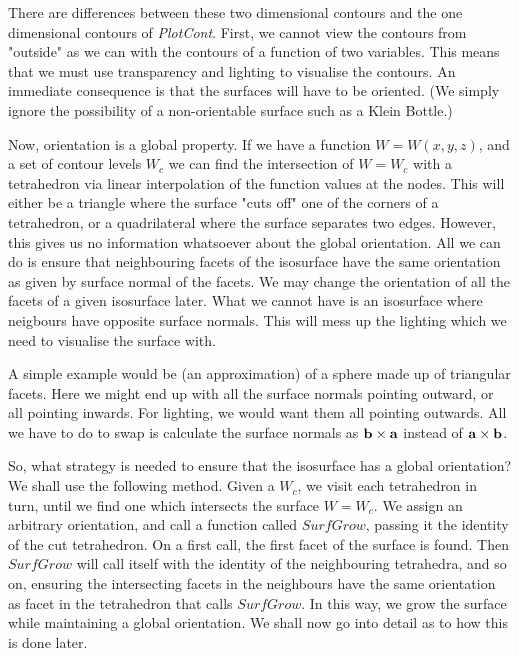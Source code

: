 \documentclass[12pt]{article}
\begin{document}
There are differences between these two dimensional contours and 
the one dimensional contours of {\it PlotCont}. First, we cannot view
the contours from "outside" as we can with the contours of a function
of two variables. This means that we must use transparency and lighting
to visualise the contours. An immediate consequence is that the
surfaces will have to be oriented. (We simply ignore the possibility
of a non-orientable surface such as a Klein Bottle.)  

Now, orientation is a global property. If we have a function
 $W=W(x,y,z)$, and a set of contour levels $W_c$ we can 
find the intersection of $W=W_c$ with a tetrahedron via linear
interpolation of the function values at the nodes. This will
either be a triangle where the surface "cuts off" one of the corners of a tetrahedron,
or a quadrilateral where the surface separates two edges.
However, this gives us no information whatsoever about the global
 orientation. All we can do is ensure that neighbouring facets of
the isosurface have the same orientation as given by surface 
normal of the facets. We may change the
orientation of all the facets of a given isosurface later. What we cannot
have is an isosurface where neigbours have opposite surface normals.
This will mess up the lighting which we need to visualise the surface with.

A simple example would be (an approximation) of a sphere made up of triangular facets.
Here we might end up with all the surface normals pointing outward, or
all pointing inwards.  
 For lighting, we would want them all pointing outwards.
All we have to do to swap is calculate the surface normals 
as ${\bf b} \times {\bf a}$
instead of ${\bf a} \times {\bf b}$.

So, what strategy is needed to ensure that the isosurface has a global
orientation? We shall use the following method. Given a $W_c$, we visit
each tetrahedron in turn, until we find one which intersects the
surface $W=W_c$. We assign an arbitrary orientation, and call
a function called $SurfGrow$,  passing it the identity of the
cut tetrahedron. On a first call, the first facet
of the surface is found. Then $SurfGrow$ will call itself with 
the identity of the  neighbouring tetrahedra, and so on, ensuring the intersecting facets
in the neighbours have the same orientation as facet in the tetrahedron
that calls $SurfGrow$. In this way, we grow the surface while maintaining 
a global orientation. We shall now go into detail as to how this
is done later.
\end{document}
